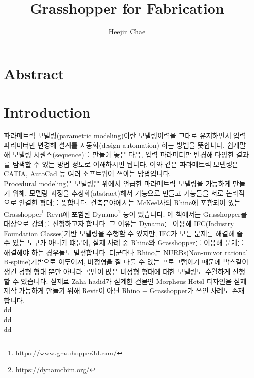 \documentclass[a4paper]{scrbook}
\begin{document}
\title{Grasshopper for Fabrication}
\author{Heejin Chae}
\frontmatter
\maketitle
\chapter{Abstract}
\tableofcontents

\mainmatter
\chapter{Introduction}
파라메트릭 모델링(parametric modeling)이란 모델링이력을 그대로 유지하면서 입력 파라미터만 변경해 설계를 자동화(design automation) 하는 방법을 뜻합니다\cite{CHANG2015125}. 
쉽게말해 모델링 시퀀스(sequence)를 만들어 놓은 다음, 입력 파라미터만 변경해 다양한 결과를 탐색할 수 있는 방법 정도로 이해하시면 됩니다. 이와 같은 파라메트릭 모델링은 CATIA, AutoCad 등 여러 소프트웨어 쓰이는 방법입니다. \\
Procedural modeling은 모델링은 위에서 언급한 파라메트릭 모델링을 가능하게 만들기 위해, 모델링 과정을 추상화(abstract)해서 기능으로 만들고 기능들을 서로 논리적으로 연결한 형태를 뜻합니다. 건축분야에서는 McNeel사의 Rhino에 포함되어 있는 Grasshopper\footnote{https://www.grasshopper3d.com/} Revit에 포함된 Dynamo\footnote{https://dynamobim.org/} 등이 있습니다. 이 책에서는 Grasshopper를 대상으로 강의를 진행하고자 합니다. 그 이유는 Dynamo를 이용해 IFC(Industry Foundation Classes)기반 모델링을 수행할 수 있지만, IFC가 모든 문제를 해결해 줄 수 있는 도구가 아니기 떄문에, 실제 사례 중 Rhino와 Grasshopper를 이용해 문제를 해결해야 하는 경우들도 발생합니다. 더군다나 Rhino는 NURBs(Non-univor rational B-spline)기반으로 이루어져, 비정형을 잘 다룰 수 있는 프로그램이기 때문에 박스같이 생긴 정형 형태 뿐만 아니라 곡면이 많은 비정형 형태에 대한 모델링도 수월하게 진행할 수 있습니다. 실제로 Zaha hadid가 설계한 건물인 Morpheus Hotel 디자인을 실제 제작 가능하게 만들기 위해 Revit이 아닌 Rhino + Grasshopper가 쓰인 사례도 존재합니다.\\
dd
\\
dd
\\
dd
\\
\end{document}
